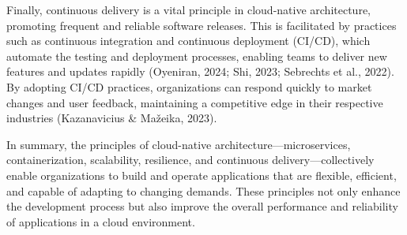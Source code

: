 Finally, continuous delivery is a vital principle in cloud-native architecture, promoting frequent and reliable software releases. This is facilitated by practices such as continuous integration and continuous deployment (CI/CD), which automate the testing and deployment processes, enabling teams to deliver new features and updates rapidly (Oyeniran, 2024; Shi, 2023; Sebrechts et al., 2022). By adopting CI/CD practices, organizations can respond quickly to market changes and user feedback, maintaining a competitive edge in their respective industries (Kazanavicius & Mažeika, 2023).

In summary, the principles of cloud-native architecture—microservices, containerization, scalability, resilience, and continuous delivery—collectively enable organizations to build and operate applications that are flexible, efficient, and capable of adapting to changing demands. These principles not only enhance the development process but also improve the overall performance and reliability of applications in a cloud environment.

